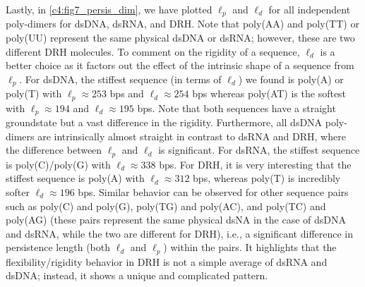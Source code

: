 Lastly, in \cref{c4:fig7_persis_dim}, we have plotted $\ell_{p}$ and $\ell_{d}$ for all independent poly-dimers for dsDNA, dsRNA, and DRH. Note that poly(AA) and poly(TT) or poly(UU) represent the same physical dsDNA or dsRNA; however, these are two different DRH molecules.
To comment on the rigidity of a sequence, $\ell_d$ is a better choice as it factors out the effect of the intrinsic shape of a sequence from $\ell_p$.
For dsDNA, the stiffest sequence (in terms of $\ell_d$) we found is poly(A) or poly(T) with $\ell_{p} \approx 253$ bps and $\ell_{d} \approx 254$ bps whereas poly(AT) is the softest with $\ell_{p} \approx 194$ and $\ell_{d} \approx 195$ bps. 
Note that both sequences have a straight groundstate but a vast difference in the rigidity. Furthermore, all dsDNA poly-dimers are intrinsically almost straight in contrast to dsRNA and DRH, where the difference between $\ell_{p}$ and $\ell_{d}$ is significant.
For dsRNA, the stiffest sequence is poly(C)/poly(G) with $\ell_d \approx 338$ bps. 
For DRH, it is very interesting that the stiffest sequence is poly(A) with $\ell_d \approx 312$ bps, whereas poly(T) is incredibly softer $\ell_d \approx 196$ bps.
Similar behavior can be observed for other sequence pairs such as poly(C) and poly(G), poly(TG) and poly(AC), and poly(TC) and poly(AG) (these pairs represent the same physical dsNA in the case of dsDNA and dsRNA, while the two are different for DRH), i.e., a significant difference in persistence length (both $\ell_d$ and $\ell_p$) within the pairs.
It highlights that the flexibility/rigidity behavior in DRH is not a simple average of dsRNA and dsDNA; instead, it shows a unique and complicated pattern.

